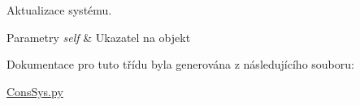 Aktualizace systému. 


\begin{DoxyParams}{Parametry}
{\em self} & Ukazatel na objekt \\
\hline
\end{DoxyParams}


Dokumentace pro tuto třídu byla generována z následujícího souboru\-:\begin{DoxyCompactItemize}
\item 
\hyperlink{ConsSys_8py}{Cons\-Sys.\-py}\end{DoxyCompactItemize}
